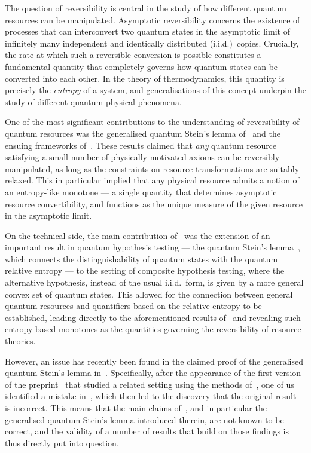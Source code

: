 \documentclass[11pt,notitlepage,tightenlines,nofootinbib,superscriptaddress]{revtex4-1}
\begin{document}
The question of reversibility is central in the study of how different quantum resources can be manipulated.
Asymptotic reversibility concerns the existence of processes that can interconvert two quantum states in the asymptotic limit of infinitely many independent and identically distributed (i.i.d.)\ copies. Crucially, the rate at which such a reversible conversion is possible constitutes a fundamental quantity that completely governs how quantum states can be converted into each other. In the theory of thermodynamics, this quantity is precisely the \emph{entropy} of a system, and generalisations of this concept underpin the study of different quantum physical phenomena.

One of the most significant contributions to the understanding of reversibility of quantum resources was the generalised quantum Stein's lemma of~\cite{Brandao2010} and the ensuing frameworks of~\cite{BrandaoPlenio1,BrandaoPlenio2,Brandao-Gour}. These results claimed that \emph{any} quantum resource satisfying a small number of physically-motivated axioms can be reversibly manipulated, as long as the constraints on resource transformations are suitably relaxed. This in particular implied that any physical resource admits a notion of an entropy-like monotone --- a single quantity that determines asymptotic resource convertibility, and functions as the unique measure of the given resource in the asymptotic limit.

On the technical side, the main contribution of~\cite{Brandao2010} was the extension of an important result in quantum hypothesis testing --- the quantum Stein's lemma~\cite{Hiai1991,Ogawa2000}, which connects the distinguishability of quantum states with the quantum relative entropy --- to the setting of composite hypothesis testing, where the alternative hypothesis, instead of the usual i.i.d.\ form, is given by a more general convex set of quantum states. This allowed for the connection between general quantum resources and quantifiers based on the relative entropy to be established, leading directly to the aforementioned results of~\cite{BrandaoPlenio1,BrandaoPlenio2,Brandao-Gour} and revealing such entropy-based monotones as the quantities governing the reversibility of resource theories.

However, an issue has recently been found in the claimed proof of the generalised quantum Stein's lemma in~\cite{Brandao2010}. Specifically, after the appearance of the first version of the preprint~\cite{fang_preprint} that studied a related setting using the methods of~\cite{Brandao2010}, one of us identified a mistake in~\cite[Lemma~16]{fang_preprint}, which then led to the discovery that the original result~\cite[Lemma~III.9]{Brandao2010} is incorrect. This means that the main claims of~\cite{Brandao2010}, and in particular the generalised quantum Stein's lemma introduced therein, are not known to be correct, and the validity of a number of results that build on those findings is thus directly put into question.
\end{document}
